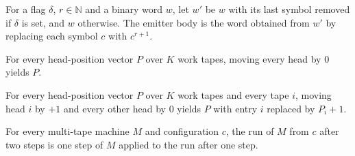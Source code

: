 \begin{definition}
\label{Turing.NTimeDiag.qyBody}
\leanok
For a flag $\delta$, $r \in \mathbb{N}$ and a binary word $w$, let $w'$ be $w$ with its last
symbol removed if $\delta$ is set, and $w$ otherwise. The emitter body is the word obtained from
$w'$ by replacing each symbol $c$ with $c^{r+1}$.
\end{definition}

\begin{theorem}
\label{Turing.NTimeDiag.qy_noMove}
\leanok
{}
For every head-position vector $P$ over $K$ work tapes, moving every head by $0$ yields $P$.
\end{theorem}

\begin{theorem}
\label{Turing.NTimeDiag.qy_moveOne}
\leanok
{}
For every head-position vector $P$ over $K$ work tapes and every tape $i$, moving head $i$ by
$+1$ and every other head by $0$ yields $P$ with entry $i$ replaced by $P_i + 1$.
\end{theorem}

\begin{theorem}
\label{Turing.NTimeDiag.qy_run_two}
\leanok
{}
For every multi-tape machine $M$ and configuration $c$, the run of $M$ from $c$ after two steps
is one step of $M$ applied to the run after one step.
\end{theorem}

